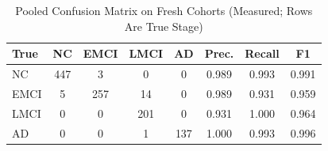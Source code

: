 \begin{table}[t]
\centering
\caption{Pooled Confusion Matrix on Fresh Cohorts (Measured; Rows Are True Stage)}
\label{tab:cm}
\footnotesize
\begin{tabular}{@{}lccccccc@{}}
\toprule
True & NC & EMCI & LMCI & AD & Prec. & Recall & F1 \\
\midrule
NC & 447 & 3 & 0 & 0 & 0.989 & 0.993 & 0.991 \\
EMCI & 5 & 257 & 14 & 0 & 0.989 & 0.931 & 0.959 \\
LMCI & 0 & 0 & 201 & 0 & 0.931 & 1.000 & 0.964 \\
AD & 0 & 0 & 1 & 137 & 1.000 & 0.993 & 0.996 \\
\bottomrule
\end{tabular}
\end{table}

